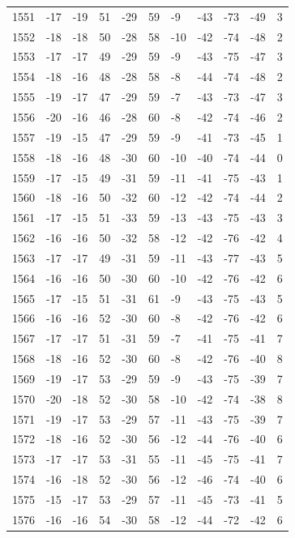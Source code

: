 \begin{table}[H]
\begin{tabular}{lllllllllll}
1551 & -17 & -19 & 51 & -29 & 59 & -9 & -43 & -73 & -49 & 3 \\
1552 & -18 & -18 & 50 & -28 & 58 & -10 & -42 & -74 & -48 & 2 \\
1553 & -17 & -17 & 49 & -29 & 59 & -9 & -43 & -75 & -47 & 3 \\
1554 & -18 & -16 & 48 & -28 & 58 & -8 & -44 & -74 & -48 & 2 \\
1555 & -19 & -17 & 47 & -29 & 59 & -7 & -43 & -73 & -47 & 3 \\
1556 & -20 & -16 & 46 & -28 & 60 & -8 & -42 & -74 & -46 & 2 \\
1557 & -19 & -15 & 47 & -29 & 59 & -9 & -41 & -73 & -45 & 1 \\
1558 & -18 & -16 & 48 & -30 & 60 & -10 & -40 & -74 & -44 & 0 \\
1559 & -17 & -15 & 49 & -31 & 59 & -11 & -41 & -75 & -43 & 1 \\
1560 & -18 & -16 & 50 & -32 & 60 & -12 & -42 & -74 & -44 & 2 \\
1561 & -17 & -15 & 51 & -33 & 59 & -13 & -43 & -75 & -43 & 3 \\
1562 & -16 & -16 & 50 & -32 & 58 & -12 & -42 & -76 & -42 & 4 \\
1563 & -17 & -17 & 49 & -31 & 59 & -11 & -43 & -77 & -43 & 5 \\
1564 & -16 & -16 & 50 & -30 & 60 & -10 & -42 & -76 & -42 & 6 \\
1565 & -17 & -15 & 51 & -31 & 61 & -9 & -43 & -75 & -43 & 5 \\
1566 & -16 & -16 & 52 & -30 & 60 & -8 & -42 & -76 & -42 & 6 \\
1567 & -17 & -17 & 51 & -31 & 59 & -7 & -41 & -75 & -41 & 7 \\
1568 & -18 & -16 & 52 & -30 & 60 & -8 & -42 & -76 & -40 & 8 \\
1569 & -19 & -17 & 53 & -29 & 59 & -9 & -43 & -75 & -39 & 7 \\
1570 & -20 & -18 & 52 & -30 & 58 & -10 & -42 & -74 & -38 & 8 \\
1571 & -19 & -17 & 53 & -29 & 57 & -11 & -43 & -75 & -39 & 7 \\
1572 & -18 & -16 & 52 & -30 & 56 & -12 & -44 & -76 & -40 & 6 \\
1573 & -17 & -17 & 53 & -31 & 55 & -11 & -45 & -75 & -41 & 7 \\
1574 & -16 & -18 & 52 & -30 & 56 & -12 & -46 & -74 & -40 & 6 \\
1575 & -15 & -17 & 53 & -29 & 57 & -11 & -45 & -73 & -41 & 5 \\
1576 & -16 & -16 & 54 & -30 & 58 & -12 & -44 & -72 & -42 & 6 \\

\end{tabular}
\end{table}
